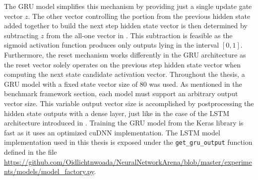 \documentclass[draft,final]{vutinfth} %
\begin{document}
    The GRU model simplifies this mechanism by providing just a single update gate vector $z$.
    The other vector controlling the portion from the previous hidden state added together to build the next step hidden state vector is then determined by subtracting $z$ from the all-one vector in .
    This subtraction is feasible as the sigmoid activation function produces only outputs lying in the interval $[0,1]$.
    Furthermore, the reset mechanism works differently in the GRU architecture as the reset vector solely operates on the previous step hidden state vector when computing the next state candidate activation vector.
    Throughout the thesis, a GRU model with a fixed state vector size of $80$ was used. As mentioned in the benchmark framework section, each model must support an arbitrary output vector size.
    This variable output vector size is accomplished by postprocessing the hidden state outputs with a dense layer, just like in the case of the LSTM architecture introduced in .
    Training the GRU model from the Keras library is fast as it uses an optimized cuDNN \cite{cuDNN} implementation.
    The LSTM model implementation used in this thesis is exposed under the \texttt{get\_gru\_output} function defined in the file \url{https://github.com/Oidlichtnwoada/NeuralNetworkArena/blob/master/experiments/models/model_factory.py}.
\end{document}
